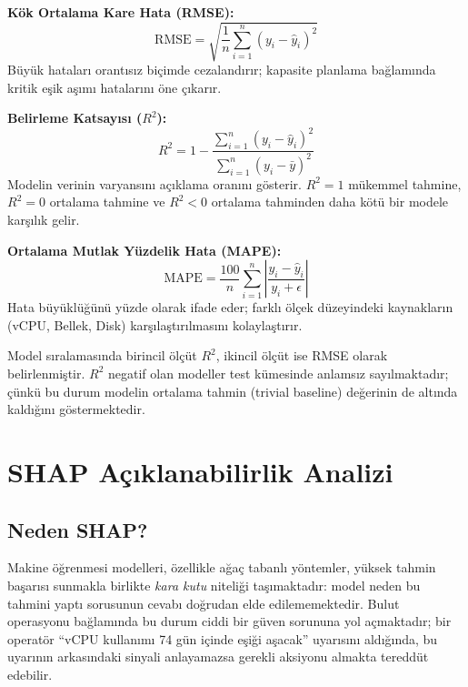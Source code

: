 \textbf{Kök Ortalama Kare Hata (RMSE):}
\begin{equation}
    \text{RMSE} = \sqrt{\frac{1}{n} \sum_{i=1}^{n} (y_i - \hat{y}_i)^2}
    \label{eq:rmse}
\end{equation}
Büyük hataları orantısız biçimde cezalandırır; kapasite planlama bağlamında kritik eşik aşımı hatalarını öne çıkarır.

\textbf{Belirleme Katsayısı ($R^2$):}
\begin{equation}
    R^2 = 1 - \frac{\sum_{i=1}^{n}(y_i - \hat{y}_i)^2}{\sum_{i=1}^{n}(y_i - \bar{y})^2}
    \label{eq:r2}
\end{equation}
Modelin verinin varyansını açıklama oranını gösterir. $R^2 = 1$ mükemmel tahmine, $R^2 = 0$ ortalama tahmine ve $R^2 < 0$ ortalama tahminden daha kötü bir modele karşılık gelir.

\textbf{Ortalama Mutlak Yüzdelik Hata (MAPE):}
\begin{equation}
    \text{MAPE} = \frac{100}{n} \sum_{i=1}^{n} \left| \frac{y_i - \hat{y}_i}{y_i + \epsilon} \right|
    \label{eq:mape}
\end{equation}
Hata büyüklüğünü yüzde olarak ifade eder; farklı ölçek düzeyindeki kaynakların (vCPU, Bellek, Disk) karşılaştırılmasını kolaylaştırır.

Model sıralamasında birincil ölçüt $R^2$, ikincil ölçüt ise RMSE olarak belirlenmiştir.
$R^2$ negatif olan modeller test kümesinde anlamsız sayılmaktadır; çünkü bu durum modelin ortalama tahmin (trivial baseline) değerinin de altında kaldığını göstermektedir.


\section{SHAP Açıklanabilirlik Analizi}
\label{sec:shap}

\subsection{Neden SHAP?}

Makine öğrenmesi modelleri, özellikle ağaç tabanlı yöntemler, yüksek tahmin başarısı sunmakla birlikte \textit{kara kutu} niteliği taşımaktadır: model neden bu tahmini yaptı sorusunun cevabı doğrudan elde edilememektedir.
Bulut operasyonu bağlamında bu durum ciddi bir güven sorununa yol açmaktadır; bir operatör ``vCPU kullanımı 74 gün içinde eşiği aşacak'' uyarısını aldığında, bu uyarının arkasındaki sinyali anlayamazsa gerekli aksiyonu almakta tereddüt edebilir.

